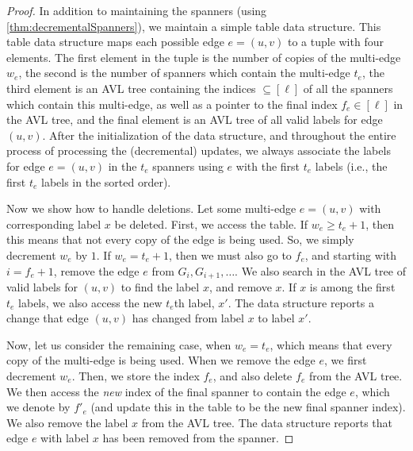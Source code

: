 \documentclass{article}
\begin{document}
\begin{proof}
    In addition to maintaining the spanners (using \cref{thm:decrementalSpanners}), we maintain a simple table data structure. This table data structure maps each possible edge $e = (u,v)$ to a tuple with four elements. The first element in the tuple is the number of copies of the multi-edge $w_e$, the second is the number of spanners which contain the multi-edge $t_e$, the third element is an AVL tree containing the indices $\subseteq [\ell]$ of all the spanners which contain this multi-edge, as well as a pointer to the final index $f_e \in [\ell]$ in the AVL tree, and the final element is an AVL tree of all valid labels for edge $(u,v)$. After the initialization of the data structure,
and throughout the entire process of processing the (decremental) updates,
    we always associate the labels for edge $e = (u,v)$
    in the $t_e$ spanners using $e$
    with the first $t_e$ labels (i.e., the first $t_e$ labels in the sorted order). 
    
    Now we show how to handle deletions. Let some multi-edge $e = (u,v)$ with corresponding label $x$ be deleted. First, we access the table. If $w_e \geq t_e + 1$, then this means that not every copy of the edge is being used. So, we simply decrement $w_e$ by $1$. If $w_e = t_e + 1$, then we must also go to $f_e$, and starting with $i = f_e + 1$, remove the edge $e$ from $G_i, G_{i+1}, \dots$. We also search in the AVL tree of valid labels for $(u,v)$ to find the label $x$, and remove $x$. If $x$ is among the first $t_e$ labels, we also access the new $t_e$th label, $x'$. The data structure reports a change that edge $(u,v)$ has changed from label $x$ to label $x'$.

    Now, let us consider the remaining case, when $w_e = t_e$, which means that every copy of the multi-edge is being used. When we remove the edge $e$, we first decrement $w_e$. Then, we store the index $f_e$, and also delete $f_e$ from the AVL tree. We then access the \emph{new} index of the final spanner to contain the edge $e$, which we denote by $f'_e$ (and update this in the table to be the new final spanner index). We also remove the label $x$ from the AVL tree. The data structure reports that edge $e$ with label $x$ has been removed from the spanner. 
    

\end{proof}
\end{document}
